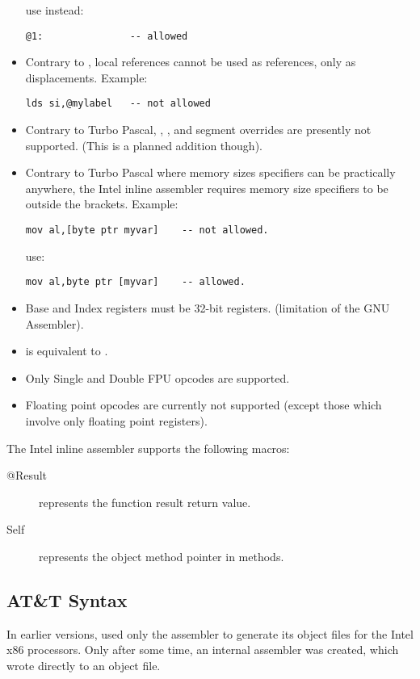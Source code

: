 \begin{itemize}
\begin{verbatim}
\end{verbatim}
use instead:
\begin{verbatim}
@1:               -- allowed
\end{verbatim}
\item Contrary to \tp, local references cannot be used as references,
   only as displacements. Example:
\begin{verbatim}
lds si,@mylabel   -- not allowed
\end{verbatim}
\item Contrary to Turbo Pascal, , ,  and
 segment overrides are presently not supported.
   (This is a planned addition though).
\item Contrary to Turbo Pascal where memory sizes specifiers can
   be practically anywhere, the \fpc Intel inline assembler requires
   memory size specifiers to be outside the brackets. Example:
\begin{verbatim}
mov al,[byte ptr myvar]    -- not allowed.
\end{verbatim}
 use:
\begin{verbatim}
mov al,byte ptr [myvar]    -- allowed.
\end{verbatim}
\item Base and Index registers must be 32-bit registers.
      (limitation of the GNU Assembler).
\item {} is equivalent to .
\item Only Single and Double FPU opcodes are supported.
\item Floating point opcodes are currently not supported
      (except those which involve only floating point registers).
\end{itemize}

The Intel inline assembler supports the following macros:
\begin{description}
\item [@Result] represents the function result return value.
\item [Self] represents the object method pointer in methods.
\end{description}

\subsection{AT\&T Syntax}
\label{se:AttSyntax}
In earlier versions, \fpc used only the \gnu {} assembler to generate 
its object files for the Intel x86 processors. Only after some time, an
internal assembler was created, which wrote directly to an object file.



